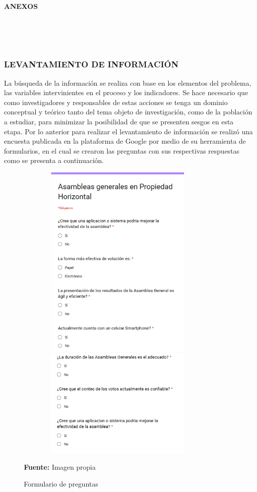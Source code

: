 \textbf{\LARGE ANEXOS}\\\\
\\\\

\newpage

\subsubsection{LEVANTAMIENTO DE INFORMACIÓN}

La búsqueda de la información se realiza con base en los elementos del problema, las variables intervinientes en el proceso y los indicadores. Se hace necesario que como investigadores y responsables de estas acciones se tenga un dominio conceptual y teórico tanto del tema objeto de investigación, como de la población a estudiar, para minimizar la posibilidad de que se presenten sesgos en esta etapa. Por lo anterior para realizar el levantamiento de información se realizó una encuesta publicada en la plataforma de Google por medio de su herramienta de formularios, en el cual se crearon las preguntas con sus respectivas respuestas como se presenta a continuación.

\begin{figure}[th!]
	\centering
	\includegraphics[width=10cm,height=15cm]{desarrollo/resultados/imgs/encuesta}
	\caption{Formulario de preguntas}{\scriptsize \textbf{Fuente:} Imagen propia}
\end{figure}

